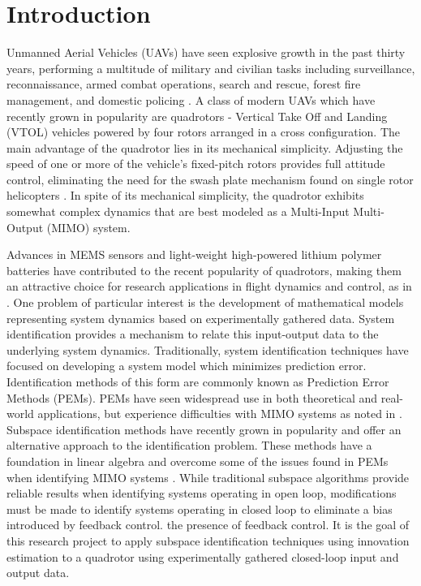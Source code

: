 \chapter{Introduction}

Unmanned Aerial Vehicles (UAVs) have seen explosive growth in the past thirty years, performing a multitude of military and civilian tasks including surveillance, reconnaissance, armed combat operations, search and rescue, forest fire management, and domestic policing \cite{sarris2001survey, valavanis2007advances}. A class of modern UAVs which have recently grown in popularity are quadrotors -  Vertical Take Off and Landing (VTOL) vehicles powered by four rotors arranged in a cross configuration. The main advantage of the quadrotor lies in its mechanical simplicity. Adjusting the speed of one or more of the vehicle's fixed-pitch rotors provides full attitude control, eliminating the need for the swash plate mechanism found on single rotor helicopters \cite{bramwell2001bramwell, gupte2012survey}. In spite of its mechanical simplicity, the quadrotor exhibits somewhat complex dynamics that are best modeled as a Multi-Input Multi-Output (MIMO) system.

Advances in MEMS sensors and light-weight high-powered lithium polymer batteries have contributed to the recent popularity of quadrotors, making them an attractive choice for research applications in flight dynamics and control, as in \cite{hoffmann2007quadrotor, kivrak2006design, mellinger2010control, michael2010grasp}. One problem of particular interest is the development of mathematical models representing system dynamics based on experimentally gathered data. System identification provides a mechanism to relate this input-output data to the underlying system dynamics. Traditionally, system identification techniques have focused on developing a system model which minimizes prediction error. Identification methods of this form are commonly known as Prediction Error Methods (PEMs). PEMs have seen widespread use in both theoretical and real-world applications, but experience difficulties with MIMO systems as noted in \cite{qin2006overview, viberg1995subspace}. Subspace identification methods have recently grown in popularity and offer an alternative approach to the identification problem. These methods have a foundation in linear algebra and overcome some of the issues found in PEMs when identifying MIMO systems \cite{katayama2005subspace}. While traditional subspace algorithms provide reliable results when identifying systems operating in open loop, modifications must be made to identify systems operating in closed loop to eliminate a bias introduced by feedback control. the presence of feedback control. It is the goal of this research project to apply subspace identification techniques using innovation estimation to a quadrotor using experimentally gathered closed-loop input and output data.


